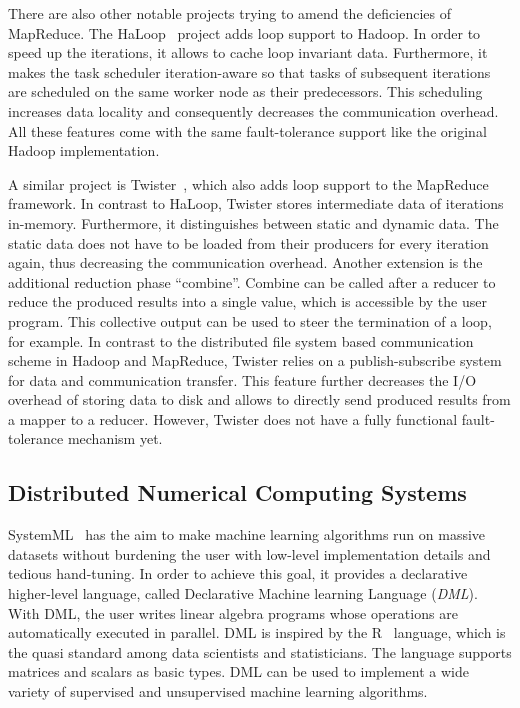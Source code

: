 There are also other notable projects trying to amend the deficiencies of MapReduce.
The HaLoop~\cite{bu:pve2010a} project adds loop support to Hadoop.
In order to speed up the iterations, it allows to cache loop invariant data.
Furthermore, it makes the task scheduler iteration-aware so that tasks of subsequent iterations are scheduled on the same worker node as their predecessors.
This scheduling increases data locality and consequently decreases the communication overhead.
All these features come with the same fault-tolerance support like the original Hadoop implementation.

A similar project is Twister~\cite{ekanayake:2010a}, which also adds loop support to the MapReduce framework.
In contrast to HaLoop, Twister stores intermediate data of iterations in-memory.
Furthermore, it distinguishes between static and dynamic data.
The static data does not have to be loaded from their producers for every iteration again, thus decreasing the communication overhead.
Another extension is the additional reduction phase ``combine''.
Combine can be called after a reducer to reduce the produced results into a single value, which is accessible by the user program.
This collective output can be used to steer the termination of a loop, for example.
In contrast to the distributed file system based communication scheme in Hadoop and MapReduce, Twister relies on a publish-subscribe system for data and communication transfer.
This feature further decreases the I/O overhead of storing data to disk and allows to directly send produced results from a mapper to a reducer.
However, Twister does not have a fully functional fault-tolerance mechanism yet.

\subsection{Distributed Numerical Computing Systems}

SystemML~\cite{ghoting:2011a} has the aim to make machine learning algorithms run on massive datasets without burdening the user with low-level implementation details and tedious hand-tuning.
In order to achieve this goal, it provides a declarative higher-level language, called Declarative Machine learning Language (\emph{DML}).
With DML, the user writes linear algebra programs whose operations are automatically executed in parallel.
DML is inspired by the R~\cite{r:1993a} language, which is the quasi standard among data scientists and statisticians.
The language supports matrices and scalars as basic types.
DML can be used to implement a wide variety of supervised and unsupervised machine learning algorithms.

